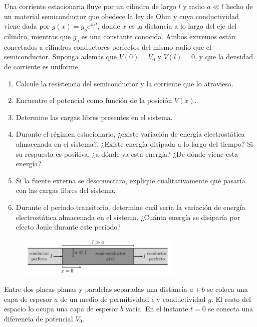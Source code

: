 \bigbreak

\np

Una corriente estacionaria fluye por un cilindro de largo $l$ y radio $a\ll l$ hecho de un material semiconductor que obedece la ley de Ohm y cuya conductividad viene dada por $g(x) = g_oe^{x/l}$, donde $x$ es la distancia a lo largo del eje del cilindro, mientras que $g_o$ es una constante conocida. Ambos extremos están conectados a cilindros conductores perfectos del mismo radio que el semiconductor. Suponga además que $V(0) = V_0$ y $V(l) = 0$, y que la densidad de corriente es uniforme.

\begin{enumerate}[label=\alph*)]
    \item Calcule la resistencia del semiconductor y la corriente que lo atraviesa.
    \item Encuentre el potencial como función de la posición $V (x)$.
    \item Determine las cargas libres presentes en el sistema.
    \item Durante el régimen estacionario, ¿existe variación de energía electrostática almacenada en el sistema?. ¿Existe energía disipada a lo largo del tiempo? Si su respuesta es positiva, ¿a dónde va esta energía? ¿De dónde viene esta energía?
    \item Si la fuente externa se desconectara, explique cualitativamente qué pasaría con las cargas libres del sistema.
    \item Durante el periodo transitorio, determine cuál sería la variación de energía electrostática almacenada en el sistema. ¿Cuánta energía se disiparía por efecto Joule durante este periodo?
\end{enumerate}

\begin{figure}[H]
    \centering
    \includegraphics[width=0.7\textwidth]{Corriente/cilindro_P_9_3.png}
\end{figure}

\bigbreak
\np

Entre dos placas planas y paralelas separadas una distancia $a+b$ se coloca una capa de espesor $a$ de un medio de permitividad $\epsilon$ y conductividad $g$. El resto del espacio lo ocupa una capa de espesor $b$ vacía. En el instante $t = 0$ se conecta una diferencia de potencial $V_0$.

